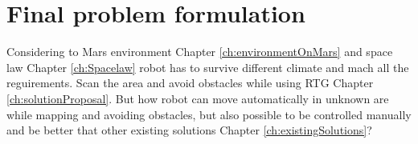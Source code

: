 \chapter{Final problem formulation}\label{ch:finalproblem}

Considering to Mars environment Chapter \ref{ch:environmentOnMars} and space law Chapter \ref{ch:Spacelaw} robot has to survive different climate and mach all the reguirements. Scan the area  and avoid obstacles while using RTG Chapter \ref{ch:solutionProposal}. But how robot can move automatically in unknown are while mapping and avoiding obstacles, but also possible to be controlled manually and be better that other existing solutions Chapter \ref{ch:existingSolutions}?








